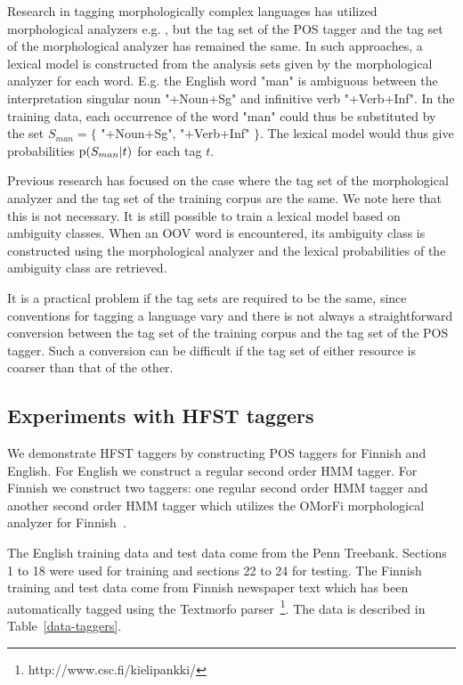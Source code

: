 \documentclass{llncs}
\begin{document}
Research in tagging morphologically complex languages has utilized
morphological analyzers e.g. \cite{Tzoukerman:1996,Oravecz:2002}, but
the tag set of the POS tagger and the tag set of the
morphological analyzer has remained the same. In such approaches, a
lexical model is constructed from the analysis sets given by the
morphological analyzer for each word. E.g. the English word "man" is
ambiguous between the interpretation singular noun "+Noun+Sg" and
infinitive verb "+Verb+Inf". In the training data, each occurrence of
the word "man" could thus be substituted by the set $S_{man} = \{$
"+Noun+Sg", "+Verb+Inf" $\}$. The lexical model would thus give
probabilities ${\rm p}(S_{man}|t)$ for each tag $t$. 

Previous research has focused on the case where the tag set of the
morphological analyzer and the tag set of the training corpus are the
same. We note here that this is not necessary.
It is still possible to train a lexical model based on
ambiguity classes. When an OOV word is encountered, its ambiguity
class is constructed using the morphological analyzer and the lexical
probabilities of the ambiguity class are retrieved.

It is a practical problem if the tag sets are required to be the
same, since conventions for tagging a
language vary and there is not always a straightforward conversion
between the tag set of the training corpus and the tag set of the
POS tagger. Such a conversion can be difficult if the tag
set of either resource is coarser than that of the other.

\subsection{Experiments with HFST taggers}

We demonstrate HFST taggers by constructing POS taggers for Finnish
and English. For English we construct a regular second order HMM
tagger. For Finnish we construct two taggers: one regular second
order HMM tagger and another second order HMM tagger which utilizes
the OMorFi morphological analyzer for Finnish~\cite{pirinen/2008}.

The English training data and test data come from the Penn
Treebank. Sections 1 to 18 were used for training and sections 22 to
24 for testing. The Finnish training and test data come from Finnish
newspaper text which has been automatically tagged using the
Textmorfo parser~\footnote{http://www.csc.fi/kielipankki/}. The data
is described in Table~\ref{data-taggers}.
\end{document}
